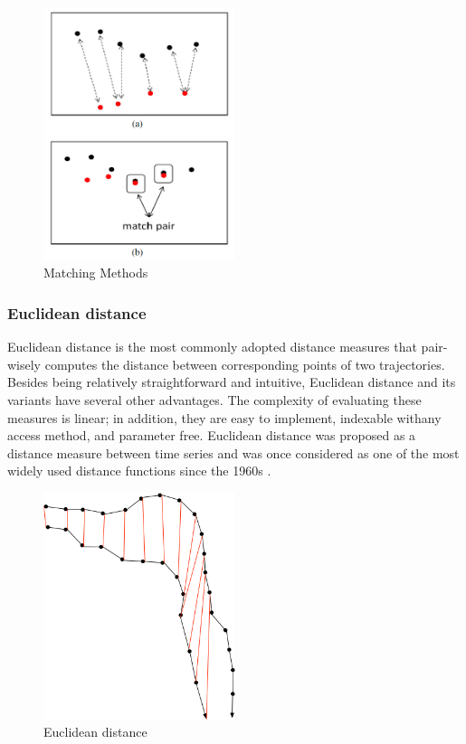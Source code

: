 \documentclass[a4paper, 12pt]{article}
\begin{document}
\begin{figure}[ht]
    \centering
    \includegraphics[width=0.5\textwidth]{Matching Methods.png}
    \caption{Matching Methods \citep{su2020survey}}
    \label{fig4}
\end{figure}

\subsubsection{Euclidean distance}
Euclidean distance is the most commonly adopted distance measures that pair-wisely computes the distance between corresponding points of two trajectories. Besides being relatively straightforward and intuitive, Euclidean distance and its variants have several other advantages. The complexity of evaluating these measures is linear; in addition, they are easy to implement, indexable withany access method, and parameter free. Euclidean distance was proposed as a distance measure between time series and was once considered as one of the most widely used distance functions since the 1960s \citep{keogh2000scaling,faloutsos1994fast,pfeifer1980three,priestley1980state}.

\begin{figure}[ht]
    \centering
    \includegraphics[width=0.5\textwidth]{Euclidean.png}
    \caption{Euclidean distance}
\end{figure}
\end{document}
